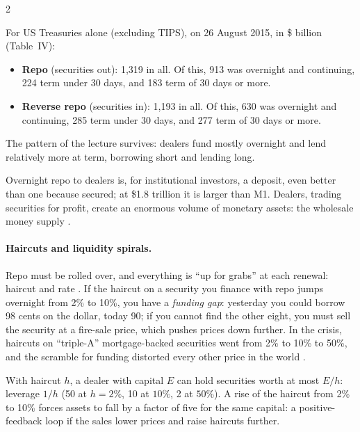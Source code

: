 \begin{paracol}{2}
\begin{coursenote}
For US Treasuries alone (excluding TIPS), on 26 August 2015, in \$ billion (Table~IV):
\begin{itemize}
  \item \textbf{Repo} (securities out): 1{,}319 in all. Of this, 913 was overnight and continuing, 224 term under 30 days, and 183 term of 30 days or more.
  \item \textbf{Reverse repo} (securities in): 1{,}193 in all. Of this, 630 was overnight and continuing, 285 term under 30 days, and 277 term of 30 days or more.
\end{itemize}
The pattern of the lecture survives: dealers fund mostly overnight and lend relatively more at term, borrowing short and lending long.
\end{coursenote}

\begin{proposition}
Overnight repo to dealers is, for institutional investors, a deposit, even better than one because secured; at \$1.8 trillion it is larger than M1. Dealers,
trading securities for profit, create an enormous volume of monetary assets: the wholesale money supply .
\end{proposition}

\paragraph{Haircuts and liquidity spirals.} Repo must be rolled over, and everything is ``up for grabs'' at each renewal: haircut and rate
. If the haircut on a security you finance with repo jumps overnight from 2\% to 10\%, you have a \emph{funding gap}: yesterday you
could borrow 98 cents on the dollar, today 90; if you cannot find the other eight, you must sell the security at a fire-sale price, which pushes prices down
further. In the crisis, haircuts on ``triple-A'' mortgage-backed securities went from 2\% to 10\% to 50\%, and the scramble for funding distorted every other price
in the world .

\begin{intuition}
With haircut $h$, a dealer with capital $E$ can hold securities worth at most $E/h$: leverage $1/h$ (50 at $h=2\%$, 10 at $10\%$, 2 at $50\%$). A rise of the
haircut from 2\% to 10\% forces assets to fall by a factor of five for the same capital: a positive-feedback loop if the sales lower prices and raise haircuts
further.
\end{intuition}


\end{paracol}
